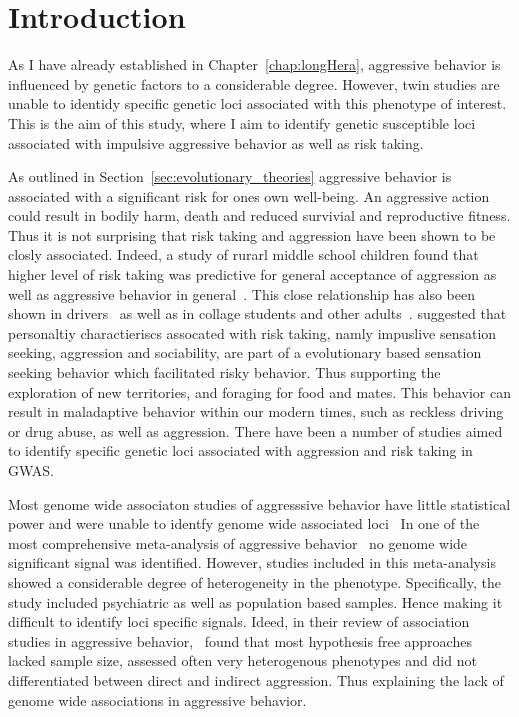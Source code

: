 \section{Introduction}
\label{sec:introduction}

As I have already established in Chapter~\ref{chap:longHera}, aggressive behavior is influenced by genetic factors to a considerable degree.
However, twin studies are unable to identidy specific genetic loci associated with this phenotype of interest.
This is the aim of this study, where I aim to identify genetic susceptible loci associated with impulsive aggressive behavior as well as risk taking.

As outlined in Section~\ref{sec:evolutionary_theories} aggressive behavior is associated with a significant risk for ones own well-being.
An aggressive action could result in bodily harm, death and reduced survivial and reproductive fitness.
Thus it is not surprising that risk taking and aggression have been shown to be closly associated.
Indeed, a study of rurarl middle school children found that higher level of risk taking was  predictive for general acceptance of aggression as well as aggressive behavior in general~\cite{Swain2004}.
This close relationship has also been shown in drivers~\cite{Deffenbacher2003} as well as in collage students and other adults~\cite{Zuckerman2000}.
\citet{Zuckerman2000} suggested that personaltiy charactieriscs assocated with risk taking, namly impuslive sensation seeking, aggression and sociability, are part of a evolutionary based sensation seeking behavior which facilitated risky behavior.
Thus supporting the exploration of new territories, and foraging for food and mates.
This behavior can result in maladaptive behavior within our modern times, such as reckless driving or drug abuse, as well as aggression.
There have been a number of studies aimed to identify specific genetic loci associated with aggression and risk taking in GWAS\@.

Most genome wide associaton studies of aggresssive behavior have little statistical power and were unable to identfy genome wide associated loci~\cite{Fernandez-Castillo2016}
In one of the most comprehensive meta-analysis of aggressive behavior~\citet{Vassos2014} no genome wide significant signal was identified.
However, studies included in this meta-analysis showed a considerable degree of heterogeneity in the phenotype.
Specifically, the study included psychiatric as well as population based samples.
Hence making it difficult to identify loci specific signals.
Ideed, in their review of association studies in aggressive behavior,~\citet{Fernandez-Castillo2016} found that most hypothesis free approaches lacked sample size, assessed often very heterogenous phenotypes and did not differentiated between direct and indirect aggression. 
Thus explaining the lack of genome wide associations in aggressive behavior.

